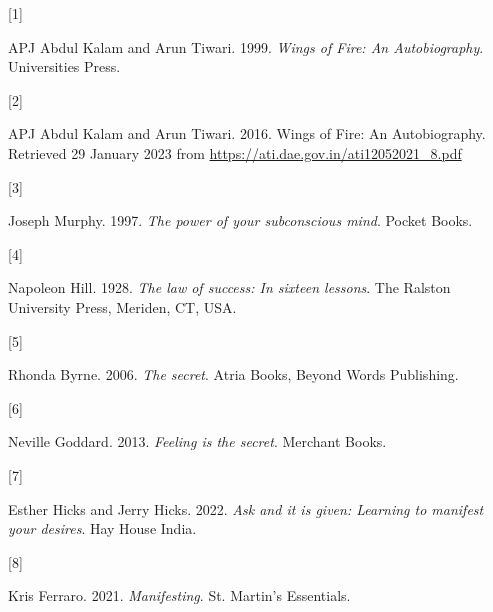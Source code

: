 \documentclass[
  a4paper,
]{article}
\newlength{\cslhangindent}
\newlength{\csllabelwidth}
\newenvironment{CSLReferences}[2] %
 {\begin{list}{}{%
  \setlength{\itemindent}{0pt}
  \setlength{\leftmargin}{0pt}
  \setlength{\parsep}{0pt}
  \ifodd #1
   \setlength{\leftmargin}{\cslhangindent}
   \setlength{\itemindent}{-1\cslhangindent}
  \fi
  \setlength{\itemsep}{#2\baselineskip}}}
 {\end{list}}
\newcommand{\CSLLeftMargin}[1]{\parbox[t]{\csllabelwidth}{\strut#1\strut}}
\newcommand{\CSLRightInline}[1]{\parbox[t]{\linewidth - \csllabelwidth}{\strut#1\strut}}
\begin{document}
\label{refs}
\begin{CSLReferences}{0}{0}
\CSLLeftMargin{{[}1{]} }%
\CSLRightInline{APJ Abdul Kalam and Arun Tiwari. 1999. \emph{{Wings of
Fire: An Autobiography}}. Universities Press.}

\CSLLeftMargin{{[}2{]} }%
\CSLRightInline{APJ Abdul Kalam and Arun Tiwari. 2016. {Wings of Fire:
An Autobiography}. Retrieved 29 January 2023 from
\url{https://ati.dae.gov.in/ati12052021_8.pdf}}

\CSLLeftMargin{{[}3{]} }%
\CSLRightInline{Joseph Murphy. 1997. \emph{The power of your
subconscious mind}. Pocket Books.}

\CSLLeftMargin{{[}4{]} }%
\CSLRightInline{Napoleon Hill. 1928. \emph{The law of success: In
sixteen lessons}. The Ralston University Press, Meriden, CT, USA.}

\CSLLeftMargin{{[}5{]} }%
\CSLRightInline{Rhonda Byrne. 2006. \emph{The secret}. Atria Books,
Beyond Words Publishing.}

\CSLLeftMargin{{[}6{]} }%
\CSLRightInline{Neville Goddard. 2013. \emph{Feeling is the secret}.
Merchant Books.}

\CSLLeftMargin{{[}7{]} }%
\CSLRightInline{Esther Hicks and Jerry Hicks. 2022. \emph{Ask and it is
given: Learning to manifest your desires}. Hay House India.}

\CSLLeftMargin{{[}8{]} }%
\CSLRightInline{Kris Ferraro. 2021. \emph{Manifesting}. St. Martin's
Essentials.}

\end{CSLReferences}
\end{document}
